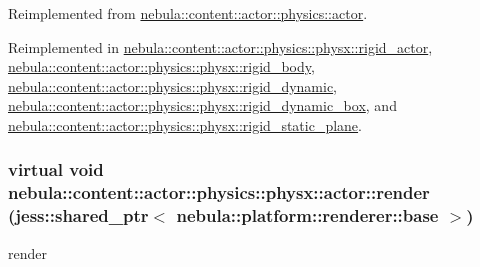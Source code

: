 Reimplemented from \hyperlink{classnebula_1_1content_1_1actor_1_1physics_1_1actor_abdcf4fcfdf017e71cea08a8c0341a4c8}{nebula::content::actor::physics::actor}.

Reimplemented in \hyperlink{classnebula_1_1content_1_1actor_1_1physics_1_1physx_1_1rigid__actor_a154a4725bb0aeaace59931e56be6258a}{nebula::content::actor::physics::physx::rigid\_\-actor}, \hyperlink{classnebula_1_1content_1_1actor_1_1physics_1_1physx_1_1rigid__body_af787176f75d680ab3ca2ad56ac64484e}{nebula::content::actor::physics::physx::rigid\_\-body}, \hyperlink{classnebula_1_1content_1_1actor_1_1physics_1_1physx_1_1rigid__dynamic_a956e5d0fadb4b75aa03e99991c84c445}{nebula::content::actor::physics::physx::rigid\_\-dynamic}, \hyperlink{classnebula_1_1content_1_1actor_1_1physics_1_1physx_1_1rigid__dynamic__box_a46578408f7f93646a86924261dbb8442}{nebula::content::actor::physics::physx::rigid\_\-dynamic\_\-box}, and \hyperlink{classnebula_1_1content_1_1actor_1_1physics_1_1physx_1_1rigid__static__plane_a16d2723283f762b1046631cec801f211}{nebula::content::actor::physics::physx::rigid\_\-static\_\-plane}.\hypertarget{classnebula_1_1content_1_1actor_1_1physics_1_1physx_1_1actor_aafea4a02068b40761e03c2a616971563}{
\subsubsection[{render}]{\setlength{\rightskip}{0pt plus 5cm}virtual void nebula::content::actor::physics::physx::actor::render (jess::shared\_\-ptr$<$ {\bf nebula::platform::renderer::base} $>$)}}
\label{classnebula_1_1content_1_1actor_1_1physics_1_1physx_1_1actor_aafea4a02068b40761e03c2a616971563}


render 


